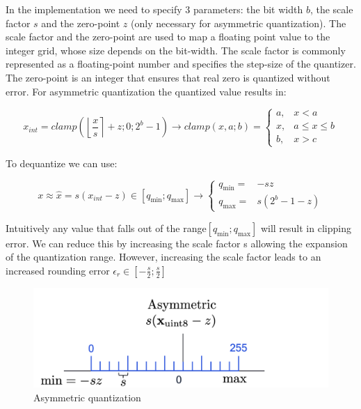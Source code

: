 \documentclass{article}
\begin{document}
        In the implementation we need to specify 3 parameters: the bit width $b$, the scale factor $s$ and the zero-point $z$ (only necessary for asymmetric quantization). The scale factor and the zero-point are used to map a floating point value to the integer grid,
        whose size depends on the bit-width. The scale factor is commonly represented as a floating-point number and specifies the step-size of the quantizer.
        The zero-point is an integer that ensures that real zero is quantized without error.
        For asymmetric quantization the quantized value results in:
        
        \begin{equation}
          x_{int} = clamp(\left\lfloor \frac{x}{s}  \right\rceil + z ; 0 ; 2^b-1) \rightarrow 
          clamp(x,a;b)= \left\{\begin{array}{cl}
            a, & x < a \\
            x, & a \le x \le b  \\
            b, & x>c
           \end{array}\right.
        \end{equation}

        To dequantize we can use:

        \begin{equation}
          x \approx \hat{x} = s(x_{int}-z) \in
          [q_{\min};q_{\max}] \rightarrow \left\{\begin{array}{cl}
            q_{\min}= & -sz \\
            q_{\max}= & s(2^b-1-z) 
           \end{array}\right.
        \end{equation}

        Intuitively any value that falls out of the range$ [q_{\min};q_{\max}]$ will result in clipping error. We can reduce this by increasing the scale factor s allowing the expansion of the quantization range.
        However, increasing the scale factor leads to an increased rounding error $\epsilon_r \in [-\frac{s}{2};\frac{s}{2}]$

        \begin{figure}[H]
          \includegraphics[scale=0.3]{../Images/AsimmQuant.png}
          \centering
          \caption{Asymmetric quantization}
        \end{figure}
\end{document}
